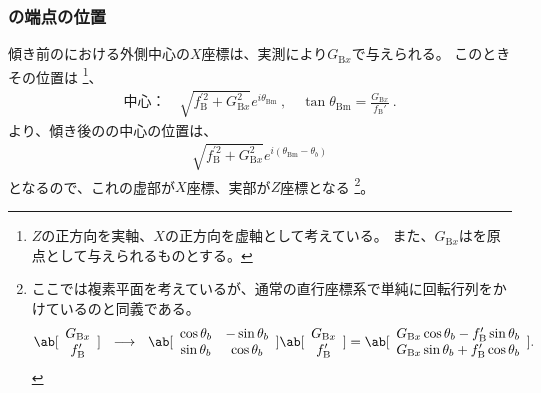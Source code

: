\subsubsection{\BottomCurvedOutcut の端点の位置}
傾き前の\BottomEndFace における外側中心の$X$座標は、実測により$G_{\mathrm Bx}$で与えられる。
このときその位置は
\footnote{$Z$の正方向を実軸、$X$の正方向を虚軸として考えている。
また、$G_{\mathrm Bx}$は\TableCenter を原点として与えられるものとする。}、
\begin{align*}
  \text{中心：}\quad
  \sqrt{f_\mathrm B^{'2}+G_{\mathrm Bx}^2}e^{i\theta_\mathrm{Bm}}~, \quad
  \tan\theta_\mathrm{Bm}= \frac{G_{\mathrm Bx}}{f_\mathrm B'}\ .
\end{align*}
より、傾き後の\nameBottomEndFace の中心の位置は、
\begin{align*}
  \sqrt{f_\mathrm B^{'2}+G_{\mathrm Bx}^2}e^{i(\theta_\mathrm{Bm}-\theta_b)}
\end{align*}
となるので、これの虚部が$X$座標、実部が$Z$座標となる
\footnote{ここでは複素平面を考えているが、通常の直行座標系で単純に回転行列をかけているのと同義である。
\begin{align*}
  \ab[
    \begin{array}{c}
      G_{\mathrm Bx}\\
      f_\mathrm B'
    \end{array}
  ]
  ~~\longrightarrow~~
  \ab[
    \begin{array}{cc}
      \cos\theta_b & -\sin\theta_b\\
      \sin\theta_b & \cos\theta_b
    \end{array}
  ]
  \ab[
    \begin{array}{c}
      G_{\mathrm Bx}\\
      f_\mathrm B'
    \end{array}
  ]
  = \ab[
    \begin{array}{c}
      G_{\mathrm Bx}\cos\theta_b-f_\mathrm B'\sin\theta_b\\
      G_{\mathrm Bx}\sin\theta_b+f_\mathrm B'\cos\theta_b
    \end{array}
  ].
\end{align*}%
}。
